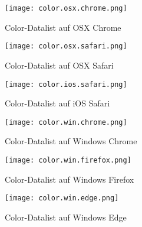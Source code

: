 \begin{figure}[!htb]
    \centering
    \begin{minipage}[b]{0.28\textwidth}
        \centering
        \texttt{[image: color.osx.chrome.png]}
        \caption{Color-Datalist auf OSX Chrome}
        \label{img:colorOsxChromeDatalist}
    \end{minipage}
    \hfill
    \begin{minipage}[b]{0.28\textwidth}
        \centering
        \texttt{[image: color.osx.safari.png]}
        \caption{Color-Datalist auf OSX Safari}
        \label{img:colorOsxSafariDatalist}
    \end{minipage}
    \hfill
    \begin{minipage}[b]{0.28\textwidth}
        \centering
        \texttt{[image: color.ios.safari.png]}
        \caption{Color-Datalist auf iOS Safari}
        \label{img:colorIsoSafariDatalist}
    \end{minipage}
\end{figure}

\begin{figure}[!htb]
    \centering
    \begin{minipage}[b]{0.28\textwidth}
        \centering
        \texttt{[image: color.win.chrome.png]}
        \caption{Color-Datalist auf Windows Chrome}
        \label{img:colorWinChromeDatalist}
    \end{minipage}
    \hfill
    \begin{minipage}[b]{0.28\textwidth}
        \centering
        \texttt{[image: color.win.firefox.png]}
        \caption{Color-Datalist auf Windows Firefox}
        \label{img:colorWinFirefoxDatalist}
    \end{minipage}
    \hfill
    \begin{minipage}[b]{0.28\textwidth}
        \centering
        \texttt{[image: color.win.edge.png]}
        \caption{Color-Datalist auf Windows Edge}
        \label{img:colorWinEdgeDatalist}
    \end{minipage}
\end{figure}


